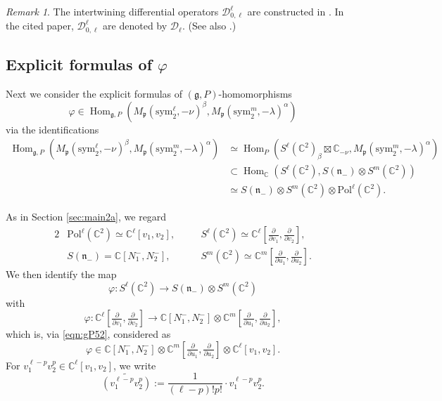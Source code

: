 \documentclass[reqno,11pt]{amsart}
\theoremstyle{remark}
\newtheorem{rem}[equation]{Remark}
\numberwithin{equation}{section}
\newcommand{\gb}{\beta}
\newcommand{\ga}{\alpha}
\newcommand{\fg}{{\mathfrak g}}
\newcommand{\fn}{{\mathfrak n}}
\newcommand{\fp}{{\mathfrak p}}
\newcommand{\C}{\mathbb{C}}
\newcommand{\Cal}{\mathcal}
\newcommand{\Hom}{\operatorname{Hom}}
\newcommand{\Pol}{\mathrm{Pol}}
\newcommand{\To}{\longrightarrow}
\newcommand{\sym}{\mathrm{sym}}
\newcommand{\D}{\Cal{D}}
\begin{document}
\begin{rem}\label{rem:diff}
The intertwining differential operators $\Cal{D}^{\ell}_{0,\ell}$ are constructed in 
\cite{KuOr25a}. In the cited paper, $\Cal{D}^{\ell}_{0,\ell}$ are denoted by $\D_\ell$.
(See also \cite[Remark 7.2]{Kubo24+}.)
\end{rem}


\subsection{Explicit formulas of $\varphi$}
\label{sec:main2b}
Next we consider the explicit formulas of $(\fg, P)$-homomorphisms
\begin{equation*}
\varphi \in \Hom_{\fg,P}(M_\fp(\sym_2^{\ell},-\nu)^{\gb},
M_\fp(\sym_2^m, -\lambda)^\ga)
\end{equation*}
via the identifications
\begin{align}
\Hom_{\fg,P}(M_\fp(\sym_2^{\ell},-\nu)^{\gb},
M_\fp(\sym_2^m, -\lambda)^\ga)
&\simeq 
\Hom_P(S^\ell(\C^2)_\beta \boxtimes \C_{-\nu} , 
 M_\fp(\sym_2^m, -\lambda)^\ga) \nonumber \\[3pt]
&\subset \Hom_\C(S^\ell(\C^2), S(\fn_-)\otimes S^m(\C^2)) \nonumber \\[3pt]
&\simeq S(\fn_-)\otimes S^m(\C^2)\otimes \Pol^\ell(\C^2).\label{eqn:gP52}
\end{align}

As in Section \ref{sec:main2a}, we regard
\begin{alignat*}{2}
&\Pol^\ell(\C^2) \simeq
\C^\ell[v_1, v_2],
\quad
&&S^\ell(\C^2) \simeq 
\C^{\ell}\left[\tfrac{\partial}{\partial v_1}, \tfrac{\partial}{\partial v_2}\right],\\[3pt]
&S(\fn_-)=\C[N^-_1, N^-_2],
\quad
&&S^m(\C^2) \simeq 
\C^m\left[\tfrac{\partial}{\partial u_1}, \tfrac{\partial}{\partial u_2}\right].
\end{alignat*}
We then identify
the map
\begin{equation*}
\varphi \colon S^\ell(\C^2) \To S(\fn_-) \otimes S^m(\C^2)
\end{equation*}
with
\begin{equation*}
\varphi \colon 
\C^{\ell}\left[\tfrac{\partial}{\partial v_1}, \tfrac{\partial}{\partial v_2}\right]
\To
\C[N_1^-, N_2^-]
\otimes 
\C^m\left[\tfrac{\partial}{\partial u_1}, \tfrac{\partial}{\partial u_2}\right],
\end{equation*}
which is, via \eqref{eqn:gP52}, considered as
\begin{equation*}
\varphi \in \C[N^-_1, N^-_2]
\otimes \C^m\left[\tfrac{\partial}{\partial u_1}, \tfrac{\partial}{\partial u_2}\right]
\otimes \C^\ell[v_1, v_2].
\end{equation*}
For $v_1^{\ell-p}v_2^p \in \C^\ell[v_1,v_2]$,
we write
\begin{equation*}
\widetilde{(v_1^{\ell-p}v_2^p)}:=\frac{1}{(\ell-p)! p!}\cdot v_1^{\ell-p}v_2^p.
\end{equation*}
\end{document}
